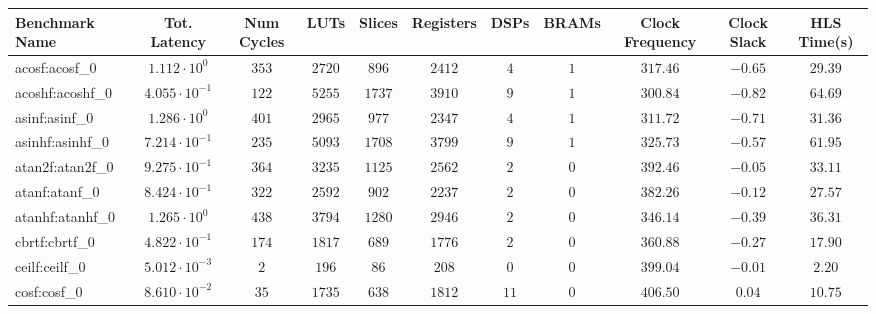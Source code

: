 \begin{tabular}{|l|c|c|c|c|c|c|c|c|c|c|}
\hline
Benchmark Name               & Tot. Latency            & Num Cycles & LUTs      & Slices    & Registers & DSPs    & BRAMs & Clock Frequency & Clock Slack & HLS Time(s) \\
\hline
acosf:acosf\_0               & $ 1.112 \cdot 10^{0}  $ & $ 353    $ & $ 2720  $ & $ 896   $ & $ 2412  $ & $ 4   $ & $ 1 $ & $ 317.46      $ & $ -0.65   $ & $ 29.39   $ \\
acoshf:acoshf\_0             & $ 4.055 \cdot 10^{-1} $ & $ 122    $ & $ 5255  $ & $ 1737  $ & $ 3910  $ & $ 9   $ & $ 1 $ & $ 300.84      $ & $ -0.82   $ & $ 64.69   $ \\
asinf:asinf\_0               & $ 1.286 \cdot 10^{0}  $ & $ 401    $ & $ 2965  $ & $ 977   $ & $ 2347  $ & $ 4   $ & $ 1 $ & $ 311.72      $ & $ -0.71   $ & $ 31.36   $ \\
asinhf:asinhf\_0             & $ 7.214 \cdot 10^{-1} $ & $ 235    $ & $ 5093  $ & $ 1708  $ & $ 3799  $ & $ 9   $ & $ 1 $ & $ 325.73      $ & $ -0.57   $ & $ 61.95   $ \\
atan2f:atan2f\_0             & $ 9.275 \cdot 10^{-1} $ & $ 364    $ & $ 3235  $ & $ 1125  $ & $ 2562  $ & $ 2   $ & $ 0 $ & $ 392.46      $ & $ -0.05   $ & $ 33.11   $ \\
atanf:atanf\_0               & $ 8.424 \cdot 10^{-1} $ & $ 322    $ & $ 2592  $ & $ 902   $ & $ 2237  $ & $ 2   $ & $ 0 $ & $ 382.26      $ & $ -0.12   $ & $ 27.57   $ \\
atanhf:atanhf\_0             & $ 1.265 \cdot 10^{0}  $ & $ 438    $ & $ 3794  $ & $ 1280  $ & $ 2946  $ & $ 2   $ & $ 0 $ & $ 346.14      $ & $ -0.39   $ & $ 36.31   $ \\
cbrtf:cbrtf\_0               & $ 4.822 \cdot 10^{-1} $ & $ 174    $ & $ 1817  $ & $ 689   $ & $ 1776  $ & $ 2   $ & $ 0 $ & $ 360.88      $ & $ -0.27   $ & $ 17.90   $ \\
ceilf:ceilf\_0               & $ 5.012 \cdot 10^{-3} $ & $ 2      $ & $ 196   $ & $ 86    $ & $ 208   $ & $ 0   $ & $ 0 $ & $ 399.04      $ & $ -0.01   $ & $ 2.20    $ \\
cosf:cosf\_0                 & $ 8.610 \cdot 10^{-2} $ & $ 35     $ & $ 1735  $ & $ 638   $ & $ 1812  $ & $ 11  $ & $ 0 $ & $ 406.50      $ & $ 0.04    $ & $ 10.75   $ \\

\end{tabular}
